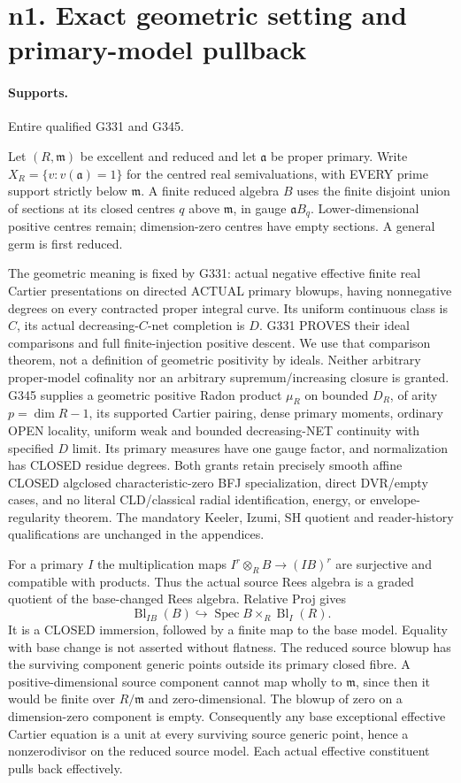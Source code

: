 \section{n1. Exact geometric setting and primary-model pullback}
\paragraph{Supports.} Entire qualified G331 and G345.

Let $(R,\mathfrak m)$ be excellent and reduced and let $\mathfrak a$ be proper primary. Write $X_R=\{v:v(\mathfrak a)=1\}$ for the centred real semivaluations, with EVERY prime support strictly below $\mathfrak m$. A finite reduced algebra $B$ uses the finite disjoint union of sections at its closed centres $q$ above $\mathfrak m$, in gauge $\mathfrak aB_q$. Lower-dimensional positive centres remain; dimension-zero centres have empty sections. A general germ is first reduced.

The geometric meaning is fixed by G331: actual negative effective finite real Cartier presentations on directed ACTUAL primary blowups, having nonnegative degrees on every contracted proper integral curve. Its uniform continuous class is $C$, its actual decreasing-$C$-net completion is $D$. G331 PROVES their ideal comparisons and full finite-injection positive descent. We use that comparison theorem, not a definition of geometric positivity by ideals. Neither arbitrary proper-model cofinality nor an arbitrary supremum/increasing closure is granted. G345 supplies a geometric positive Radon product $\mu_R$ on bounded $D_R$, of arity $p=\dim R-1$, its supported Cartier pairing, dense primary moments, ordinary OPEN locality, uniform weak and bounded decreasing-NET continuity with specified $D$ limit. Its primary measures have one gauge factor, and normalization has CLOSED residue degrees. Both grants retain precisely smooth affine CLOSED algclosed characteristic-zero BFJ specialization, direct DVR/empty cases, and no literal CLD/classical radial identification, energy, or envelope-regularity theorem. The mandatory Keeler, Izumi, SH quotient and reader-history qualifications are unchanged in the appendices.

For a primary $I$ the multiplication maps $I^r\otimes_R B\to(IB)^r$ are surjective and compatible with products. Thus the actual source Rees algebra is a graded quotient of the base-changed Rees algebra. Relative Proj gives
\[
 \operatorname{Bl}_{IB}(B)\hookrightarrow\operatorname{Spec}B\times_R\operatorname{Bl}_I(R).
\]
It is a CLOSED immersion, followed by a finite map to the base model. Equality with base change is not asserted without flatness. The reduced source blowup has the surviving component generic points outside its primary closed fibre. A positive-dimensional source component cannot map wholly to $\mathfrak m$, since then it would be finite over $R/\mathfrak m$ and zero-dimensional. The blowup of zero on a dimension-zero component is empty. Consequently any base exceptional effective Cartier equation is a unit at every surviving source generic point, hence a nonzerodivisor on the reduced source model. Each actual effective constituent pulls back effectively.

